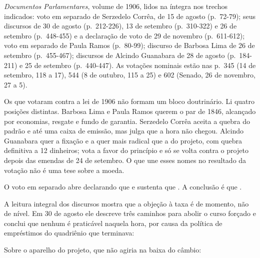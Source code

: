

\textit{Documentos Parlamentares}, volume de 1906, lidos na íntegra nos trechos
indicados: voto em separado de Serzedelo Corrêa, de 15 de agosto (p.~72-79);
seus discursos de 30 de agosto (p.~212-226), 13 de setembro (p.~310-322) e 26 de
setembro (p.~448-455) e a declaração de voto de 29 de novembro (p.~611-612);
voto em separado de Paula Ramos (p.~80-99); discurso de Barbosa Lima de 26 de
setembro (p.~455-467); discursos de Alcindo Guanabara de 28 de agosto
(p.~184-211) e 25 de setembro (p.~440-447). As votações nominais estão nas
p.~345 (14 de setembro, 118 a 17), 544 (8 de outubro, 115 a 25) e 602 (Senado,
26 de novembro, 27 a 5).


Os que votaram contra a lei de 1906 não formam um bloco doutrinário. Li quatro
posições distintas. Barbosa Lima e Paula Ramos querem o par de 1846, alcançado
por economias, resgate e fundo de garantia. Serzedelo Corrêa aceita a quebra do
padrão e até uma caixa de emissão, mas julga que a hora não chegou. Alcindo
Guanabara quer a fixação e a quer mais radical que a do projeto, com quebra
definitiva a 12 dinheiros; vota a favor do princípio e só se volta contra o
projeto depois das emendas de 24 de setembro. O que une esses nomes no
resultado da votação não é uma tese sobre a moeda.


O voto em separado abre declarando que   e sustenta que  . A conclusão é que  .

A leitura integral dos discursos mostra que a objeção à taxa é de momento, não
de nível. Em 30 de agosto ele descreve três caminhos para abolir o curso
forçado e conclui que nenhum é praticável naquela hora, por causa da política
de empréstimos do quadriênio que terminava:


Sobre o aparelho do projeto, que não agiria na baixa do câmbio:


